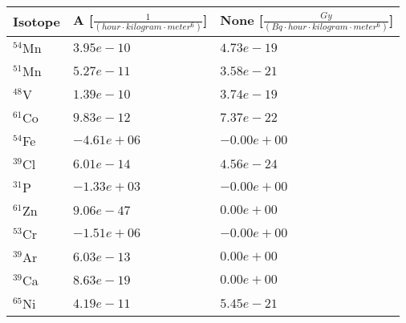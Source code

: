\begin{tabular}{lll}
\hline
 Isotope   & A [$\frac{1}{\left(hour \cdot kilogram \cdot meter^{6}\right)}$]   & None [$\frac{Gy}{\left(Bq \cdot hour \cdot kilogram \cdot meter^{6}\right)}$]   \\
\hline
 $^{54}$Mn & $3.95e-10 $                                                        & $4.73e-19 $                                                                     \\
 $^{51}$Mn & $5.27e-11 $                                                        & $3.58e-21 $                                                                     \\
 $^{48}$V  & $1.39e-10 $                                                        & $3.74e-19 $                                                                     \\
 $^{61}$Co & $9.83e-12 $                                                        & $7.37e-22 $                                                                     \\
 $^{54}$Fe & $-4.61e+06 $                                                       & $-0.00e+00 $                                                                    \\
 $^{39}$Cl & $6.01e-14 $                                                        & $4.56e-24 $                                                                     \\
 $^{31}$P  & $-1.33e+03 $                                                       & $-0.00e+00 $                                                                    \\
 $^{61}$Zn & $9.06e-47 $                                                        & $0.00e+00 $                                                                     \\
 $^{53}$Cr & $-1.51e+06 $                                                       & $-0.00e+00 $                                                                    \\
 $^{39}$Ar & $6.03e-13 $                                                        & $0.00e+00 $                                                                     \\
 $^{39}$Ca & $8.63e-19 $                                                        & $0.00e+00 $                                                                     \\
 $^{65}$Ni & $4.19e-11 $                                                        & $5.45e-21 $                                                                     \\

\end{tabular}
